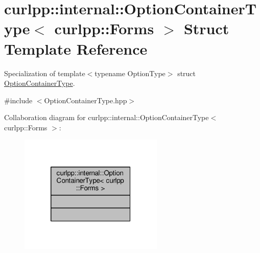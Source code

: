 \hypertarget{structcurlpp_1_1internal_1_1OptionContainerType_3_01curlpp_1_1Forms_01_4}{\section{curlpp\-:\-:internal\-:\-:Option\-Container\-Type$<$ curlpp\-:\-:Forms $>$ Struct Template Reference}
\label{structcurlpp_1_1internal_1_1OptionContainerType_3_01curlpp_1_1Forms_01_4}
}


Specialization of template$<$typename Option\-Type$>$ struct \hyperlink{structcurlpp_1_1internal_1_1OptionContainerType}{Option\-Container\-Type}.  




{\ttfamily \#include $<$Option\-Container\-Type.\-hpp$>$}



Collaboration diagram for curlpp\-:\-:internal\-:\-:Option\-Container\-Type$<$ curlpp\-:\-:Forms $>$\-:
\nopagebreak
\begin{figure}[H]
\begin{center}
\leavevmode
\includegraphics[width=194pt]{structcurlpp_1_1internal_1_1OptionContainerType_3_01curlpp_1_1Forms_01_4__coll__graph}
\end{center}
\end{figure}
